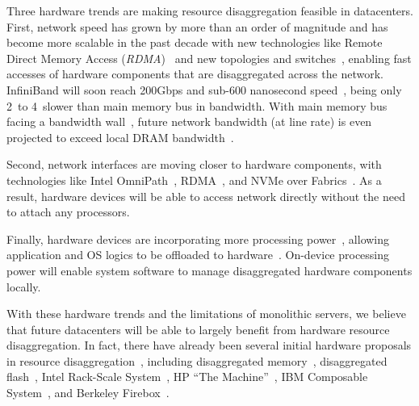 Three hardware trends are making resource disaggregation feasible in datacenters.
First, network speed has grown by more than an order of magnitude and has become more scalable in the past decade %
with new technologies like Remote Direct Memory Access ({\it RDMA})~\cite{ibverbs} 
and new topologies and switches~\cite{FireBox-FASTKeynote,costa15-r2c2,Costa-WRSC14},
enabling fast accesses of hardware components that are disaggregated across the network.
InfiniBand will soon reach 200Gbps and sub-600 nanosecond speed~\cite{Mellanox-ConnectX6-IB},
being only 2\x\ to 4\x\ slower than main memory bus in bandwidth.
With main memory bus facing a bandwidth wall~\cite{BW-Wall-ISCA09},
future network bandwidth (at line rate) is even projected to exceed local DRAM bandwidth~\cite{CacheCloud-hotcloud18}.

Second, network interfaces are moving closer to hardware components,
with technologies like Intel OmniPath~\cite{OmniPath},
RDMA~\cite{ibverbs},
and NVMe over Fabrics~\cite{NVMe-fabrics-Inteltalk,NVMe-fabrics}.
As a result, hardware devices will be able to access network directly 
without the need to attach any processors. 

Finally, hardware devices are incorporating more processing power~\cite{Ahn15-PIM,Bojnordi12,Mellanox-SmartNIC,Mellanox-SmartNIC2,Agilio-SmartNIC,Junwhan-ISCA17},
allowing application and OS logics to be offloaded to hardware~\cite{Willow,Kaufmann16-ASPLOS}.
On-device processing power will enable system software to manage disaggregated hardware components locally.

With these hardware trends and the limitations of monolithic servers,
we believe that future datacenters will be able to largely benefit from hardware resource disaggregation.
In fact, there have already been several initial hardware proposals in resource disaggregation~\cite{OCP},
including disaggregated memory~\cite{Lim09-disaggregate,Scaleout-numa,Nitu18-EUROSYS}, 
disaggregated flash~\cite{FlashDisaggregation,ReFlex},
Intel Rack-Scale System~\cite{IntelRackScale}, 
HP ``The Machine''~\cite{HP-TheMachine,HP-MemoryOS}, 
IBM Composable System~\cite{IBM-Composable},
and Berkeley Firebox~\cite{FireBox-FASTKeynote}.

